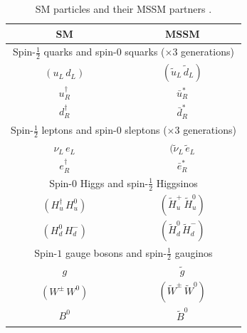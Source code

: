 			\begin{table}[!thp]
				\centering
				\caption{\gls{SM} particles and their \gls{MSSM} partners \cite{pdg}.}
				\begin{tabular}{| c | c |}
				\hline
				\gls{SM} 	& \gls{MSSM} \\[1ex] \hline
				\multicolumn{2}{|c|}{Spin-$\frac{1}{2}$ quarks and spin-$0$ squarks ($\times 3$ generations)} \\[1ex] \hline
				$(u_{L} \, d_{L})$ 					& $(\tilde{u}_{L} \, \tilde{d}_{L})$ \\[1ex]
				$u^{\dagger}_{R}$ 					& $\bar{u}^{*}_{R}$ \\[1ex]
				$d^{\dagger}_{R}$ 					& $\bar{d}^{*}_{R}$ \\[1ex] 
				\hline \hline

				\multicolumn{2}{|c|}{Spin-$\frac{1}{2}$ leptons and spin-$0$ sleptons ($\times 3$ generations)} \\[1ex] \hline
				${\nu_{L} \, e_{L}}$ 				& $(\tilde{\nu}_{L} \,  \tilde{e}_{L}$ \\[1ex]
				$e^{\dagger}_{R}$ 					& $\bar{e}^{*}_{R}$ \\[1ex]

				\hline \hline
				\multicolumn{2}{|c|}{Spin-$0$ Higgs and spin-$\frac{1}{2}$ Higgsinos} \\[1ex] \hline
				$(H^{\dagger}_{u} 	\, H^{0}_{u})$ 	& $(\tilde{H}^{+}_{u} \, \tilde{H}^{0}_{u} )$ \\[1ex]
				$(H^{0}_{d} 		\, H^{-}_{d})$ 	& $(\tilde{H}^{0}_{d} \, \tilde{H}^{-}_{d} )$ \\[1ex]

				\hline \hline
				\multicolumn{2}{|c|}{Spin-$1$ gauge bosons and spin-$\frac{1}{2}$ gauginos} \\[1ex] \hline
				$g$									& $\tilde{g}$ \\[1ex]
				$(W^{\pm} \, W^{0})$ 				& $(\tilde{W}^{\pm} \, \tilde{W}^{0})$ \\[1ex]
				$B^{0}$ 							& $\tilde{B}^{0}$ \\[1ex]
				\hline \hline

 				\end{tabular}
				\label{tab:MSSM}
			\end{table}


